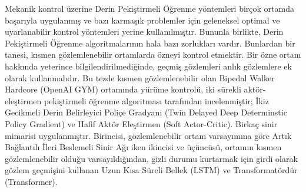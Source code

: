 Mekanik kontrol üzerine Derin Pekiştirmeli Öğrenme yöntemleri birçok ortamda başarıyla uygulanmış ve bazı karmaşık problemler için geleneksel optimal ve uyarlanabilir kontrol yöntemleri yerine kullanılmıştır.
Bununla birlikte, Derin Pekiştirmeli Öğrenme algoritmalarının hala bazı zorlukları vardır.
Bunlardan bir tanesi, kısmen gözlemlenebilir ortamlarda özneyi kontrol etmektir.
Bir özne ortam hakkında yeterince bilgilendirilmediğinde, geçmiş gözlemleri anlık gözlemlere ek olarak kullanmalıdır.
Bu tezde kısmen gözlemlenebilir olan Bipedal Walker Hardcore (OpenAI GYM) ortamında yürüme kontrolü,
iki sürekli aktör-eleştirmen pekiştirmeli öğrenme algoritması tarafından incelenmiştir; İkiz Gecikmeli Derin Belirleyici Poliçe Gradyanı (Twin Delayed Deep Determinstic Policy Gradient) ve Hafif Aktör Eleştirmen (Soft Actor-Critic).
Birkaç sinir mimarisi uygulanmıştır.
Birincisi, gözlemlenebilir ortam varsayımına göre Artık Bağlantılı İleri Beslemeli Sinir Ağı iken
ikincisi ve üçüncüsü, ortamın kısmen gözlemlenebilir olduğu varsayıldığından, gizli durumu kurtarmak için girdi olarak gözlem geçmişini kullanan Uzun Kısa Süreli Bellek (LSTM) ve Transformatördür (Transformer).